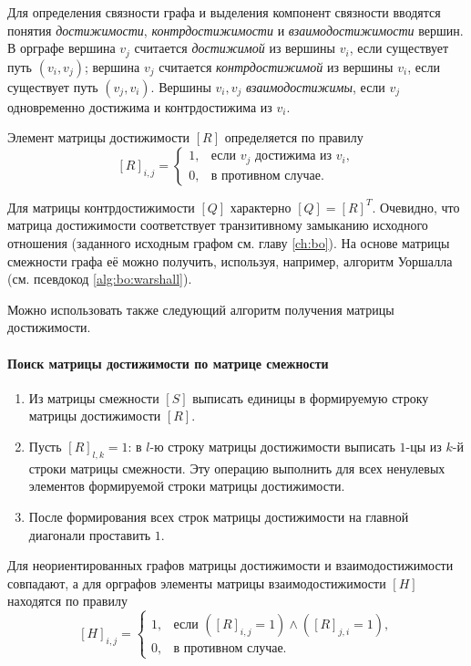 Для определения связности графа и выделения компонент связности вводятся понятия \emph{достижимости}, \emph{контрдостижимости} и \emph{взаимодостижимости} вершин. В орграфе вершина $v_j$ считается \emph{достижимой} из вершины $v_i$, если существует путь $(v_i,v_j)$; вершина $v_j$ считается \emph{контрдостижимой} из вершины $v_i$, если существует путь $(v_j,v_i)$. Вершины $v_i,v_j$ \emph{взаимодостижимы}, если $v_j$ одновременно достижима и контрдостижима из $v_i$.

Элемент матрицы достижимости $[R]$ определяется по правилу 
\[
    [R]_{i,j}=
    \begin{cases}
        1,&\text{если $v_j$ достижима из $v_i$},\\
        0,&\text{в противном случае}.
    \end{cases}
\]

Для матрицы контрдостижимости $[Q]$ характерно $[Q]=[R]^T$. Очевидно, что матрица достижимости соответствует транзитивному замыканию исходного отношения (заданного исходным графом см. главу \ref{ch:bo}). На основе матрицы смежности графа её можно получить, используя, например, алгоритм Уоршалла (см. псевдокод \ref{alg:bo:warshall}).

Можно использовать также следующий алгоритм получения матрицы достижимости.
\paragraph{Поиск матрицы достижимости по матрице смежности}
\begin{enumerate}
    \item Из матрицы смежности $[S]$ выписать единицы в формируемую строку матрицы достижимости $[R]$.
    \item Пусть $[R]_{l,k}=1$: в $l$-ю строку матрицы достижимости выписать $1$-цы из $k$-й строки матрицы смежности. Эту операцию выполнить для всех ненулевых элементов формируемой строки матрицы достижимости.
    \item После формирования всех строк матрицы достижимости на главной диагонали проставить $1$.
\end{enumerate}

Для неориентированных графов матрицы достижимости и взаимодостижимости совпадают, а для орграфов элементы матрицы взаимодостижимости $[H]$ находятся по правилу
\[
    [H]_{i,j}=
    \begin{cases}
        1,&\text{если $([R]_{i,j}=1)\land([R]_{j,i}=1)$},\\
        0,&\text{в противном случае}.
    \end{cases}
\]

